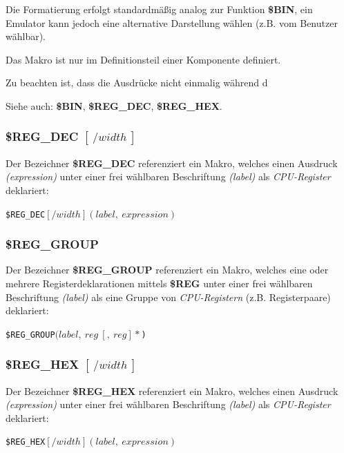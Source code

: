 \documentclass{scrartcl}
\begin{document}
\vspace{10pt}
\noindent Die Formatierung erfolgt standardmäßig analog zur Funktion \textbf{\$BIN}, ein Emulator kann jedoch eine alternative Darstellung wählen (z.B. vom Benutzer wählbar).

\vspace{10pt}
\noindent Das Makro ist nur im Definitionsteil einer Komponente definiert.

Zu beachten ist, dass die Ausdrücke nicht einmalig während d

\vspace{10pt}
\noindent Siehe auch: \textbf{\$BIN}, \textbf{\$REG\_DEC}, \textbf{\$REG\_HEX}.

\subsubsection{\$REG\_DEC $[~/width~]$}

\noindent Der Bezeichner \textbf{\$REG\_DEC} referenziert ein Makro, welches einen Ausdruck \textit{(expression)} unter einer frei wählbaren Beschriftung \textit{(label)} als \textit{CPU-Register} deklariert:

\vspace{10pt}
\texttt{\$REG\_DEC$[/width](label,~expression)$}

\subsubsection{\$REG\_GROUP}

\noindent Der Bezeichner \textbf{\$REG\_GROUP} referenziert ein Makro, welches eine oder mehrere Registerdeklarationen mittels \textbf{\$REG} unter einer frei wählbaren Beschriftung \textit{(label)} als eine Gruppe von \textit{CPU-Registern} (z.B. Registerpaare) deklariert:

\vspace{10pt}
\texttt{\$REG\_GROUP$(label,~reg~[,~reg]*$)}

\subsubsection{\$REG\_HEX $[~/width~]$}

\noindent Der Bezeichner \textbf{\$REG\_HEX} referenziert ein Makro, welches einen Ausdruck \textit{(expression)} unter einer frei wählbaren Beschriftung \textit{(label)} als \textit{CPU-Register} deklariert:

\vspace{10pt}
\texttt{\$REG\_HEX$[/width](label,~expression)$}
\end{document}
